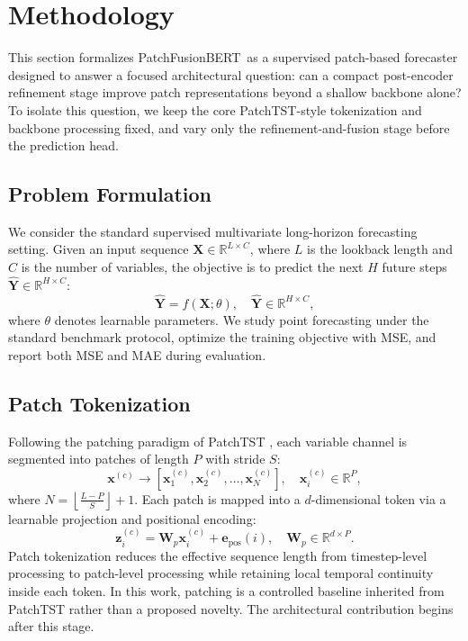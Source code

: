 \documentclass{ieeeaccess}
\newcommand{\model}{PatchFusionBERT\xspace}
\begin{document}
\section{Methodology}\label{sec:methodology}

This section formalizes \model\ as a supervised patch-based forecaster designed to
answer a focused architectural question: can a compact post-encoder refinement stage
improve patch representations beyond a shallow backbone alone? To isolate this
question, we keep the core PatchTST-style tokenization and backbone processing fixed,
and vary only the refinement-and-fusion stage before the prediction head.

\subsection{Problem Formulation}
We consider the standard supervised multivariate long-horizon forecasting setting.
Given an input sequence $\mathbf{X} \in \mathbb{R}^{L \times C}$, where $L$ is the
lookback length and $C$ is the number of variables, the objective is to predict the
next $H$ future steps $\hat{\mathbf{Y}} \in \mathbb{R}^{H \times C}$:
\begin{equation}
    \hat{\mathbf{Y}} = f(\mathbf{X}; \theta), \quad \hat{\mathbf{Y}} \in \mathbb{R}^{H \times C},
\end{equation}
where $\theta$ denotes learnable parameters. We study point forecasting under the
standard benchmark protocol, optimize the training objective with MSE, and report both
MSE and MAE during evaluation.

\subsection{Patch Tokenization}
Following the patching paradigm of PatchTST \cite{nie2023patchtst}, each variable
channel is segmented into patches of length $P$ with stride $S$:
\begin{equation}
    \mathbf{x}^{(c)} \rightarrow [\mathbf{x}^{(c)}_1, \mathbf{x}^{(c)}_2, \ldots,
    \mathbf{x}^{(c)}_N], \quad \mathbf{x}^{(c)}_i \in \mathbb{R}^{P},
\end{equation}
where $N = \left\lfloor \frac{L - P}{S} \right\rfloor + 1$.
Each patch is mapped into a $d$-dimensional token via a learnable projection and
positional encoding:
\begin{equation}
    \mathbf{z}^{(c)}_i = \mathbf{W}_{p}\mathbf{x}^{(c)}_i + \mathbf{e}_{\text{pos}}(i),
    \quad \mathbf{W}_{p} \in \mathbb{R}^{d \times P}.
\end{equation}
Patch tokenization reduces the effective sequence length from timestep-level
processing to patch-level processing while retaining local temporal continuity inside
each token. In this work, patching is a controlled baseline inherited from PatchTST
rather than a proposed novelty. The architectural contribution begins after this stage.
\end{document}
